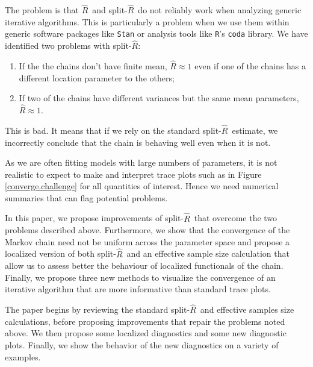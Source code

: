 \documentclass[american,]{article}
\newcommand{\Rhat}{$\widehat{R}$}
\newcommand{\sRhat}{split-$\widehat{R}$}
\begin{document}
The problem is that \Rhat\ and \sRhat\ do not reliably work when analyzing generic iterative algorithms.  This is particularly a problem when we use them within generic software packages like \texttt{Stan} or analysis tools like \texttt{R}'s \texttt{coda} library.  We have identified two problems with \sRhat : 
\begin{enumerate}
\item If the the chains don't have finite mean, $\widehat{R} \approx 1$ even if one of the chains has a different location parameter to the others;
\item If two of the chains have different variances but the same mean parameters, $\widehat{R} \approx 1$.
\end{enumerate}
This is bad. It means that if we rely on the standard \sRhat\ estimate, we incorrectly conclude that the chain is behaving well even when it is not.

As we are often fitting models with large
numbers of parameters, it is not realistic to expect to make and interpret
trace plots such as in Figure \ref{converge.challenge} for all
quantities of interest. Hence we need numerical summaries that can flag
potential problems. 

In this paper, we propose improvements of 
\sRhat\ that overcome the two 
problems described above. Furthermore, we show that the convergence
of the Markov chain need not be uniform across the parameter space
and propose a localized version of both \sRhat\ and an effective sample size 
calculation that allow us to assess better the behaviour of localized 
functionals of the chain. Finally, we propose three new methods to visualize the 
convergence of an iterative algorithm that are more informative than standard 
trace plots.

The paper begins by reviewing the standard \sRhat\ and effective samples size calculations, before proposing improvements that repair the problems noted above. We then propose some localized diagnostics and some new diagnostic plots. Finally, we show the behavior of the new diagnostics on a variety of examples.

  
\end{document}
